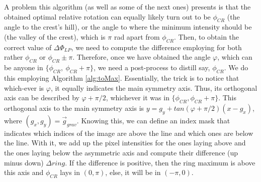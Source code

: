 \documentclass[11pt, a4paper, twoside]{article} %
\begin{document}

A problem this algorithm (as well as some of the next ones) presents is that the obtained optimal relative rotation can equally likely turn out to be $\phi_{CR}$ (the angle to the crest's hill), or the angle to where the minimum intensity should be (the valley of the crest), which is $\pi$ rad apart from $\phi_{CR}$. Then, to obtain the correct value of $\Delta\Phi_{LP}$, we need to compute the difference employing for both rather $\phi_{CR}$ or $\phi_{CR}\pm\pi$. Therefore, once we have obtained the angle $\varphi$, which can be anyone in $\{\phi_{CR},\ \phi_{CR}+\pi\}$, we need a post-process to distill say, $\phi_{CR}$. We do this employing Algorithm \ref{alg:toMax}. Essentially, the trick is to notice that which-ever is $\varphi$, it equally indicates the main symmetry axis. Thus, its orthogonal axis can be described by $\varphi+\pi/2$, whichever it was in $\{\phi_{CR},\phi_{CR}+\pi\}$. This orthogonal axis to the main symmetry axis is $y=g_y+tan(\varphi+\pi/2)(x-g_x)$, where $(g_x,g_y)=\vec{g}_{grav}$. Knowing this, we can define an index mask that indicates which indices of the image are above the line and which ones are below the line. With it, we add up the pixel intensities for the ones laying above and the ones laying below the asymmetric axis and compute their difference (up minus down) $\Delta ring$. If the difference is positive, then the ring maximum is above this axis and $\phi_{CR}$ lays in $(0,\pi)$, else, it will be in $(-\pi,0)$.
\end{document}
